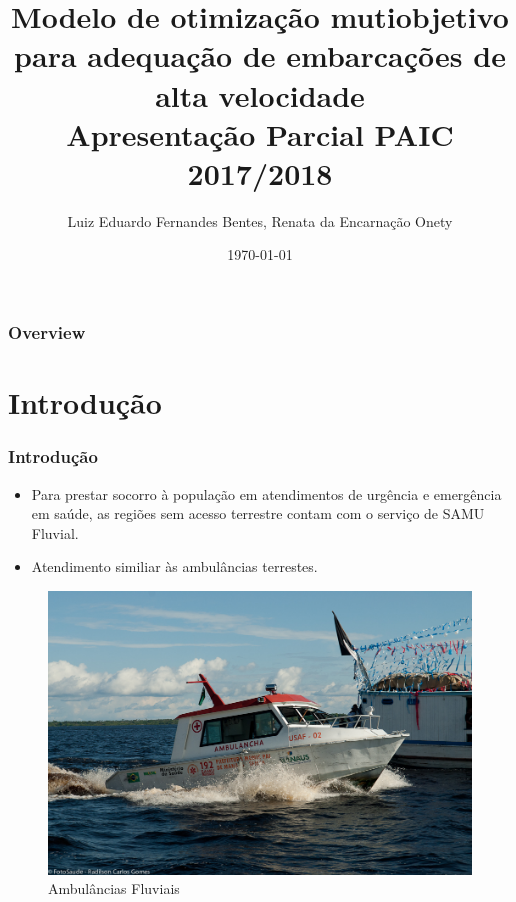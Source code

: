 \documentclass{beamer}
\title[ ]{\textbf{Modelo de otimização mutiobjetivo para adequação de embarcações de alta velocidade}\\Apresentação Parcial PAIC 2017/2018} %
\author[L.E.F.B]{Luiz Eduardo Fernandes Bentes, Renata da Encarnação Onety} %
\institute[UEA] %
{
Universidade do Estado do Amazonas \\ Escola Superior de Tecnologia -- EST\\ Manaus - Amazonas - Brasil\\ %
\medskip
\textit{\{lefb.eng,ronety\} @uea.edu.br} %
}
\date{\today} %
\begin{document}
\begin{frame}
\titlepage %
\end{frame}

\begin{frame}
\frametitle{Overview}
\tableofcontents
\end{frame}

\section{Introdução} 
\begin{frame}
 \tableofcontents[ 
    currentsubsection, 
    hideothersubsections, 
    sectionstyle=show/shaded
    ] 
\end{frame}
\begin{frame}
\frametitle{Introdução}
\begin{itemize}
	\item Para prestar socorro à população em atendimentos de urgência e emergência em saúde, as regiões sem acesso terrestre contam com o serviço de SAMU Fluvial.
	\item Atendimento similiar às ambulâncias terrestes.
\end{itemize}

\begin{figure}[h]
	\centering
	\includegraphics[scale=0.7]{samu17}
	\caption{Ambulâncias Fluviais}
	\label{fig:ambulancha}
\end{figure}

\end{frame}
\end{document}
